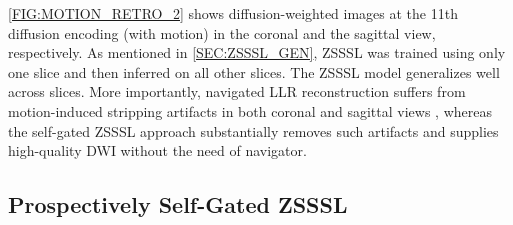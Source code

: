 \documentclass[journal,twoside,web]{ieeecolor}
\begin{document}
	\cref{FIG:MOTION_RETRO_2} shows diffusion-weighted images
	at the 11th diffusion encoding (with motion)
	in the coronal and the sagittal view, respectively.
	As mentioned in \cref{SEC:ZSSSL_GEN}, ZSSSL was trained using only one slice
	and then inferred on all other slices.
	The ZSSSL model generalizes well across slices.
	More importantly, navigated LLR reconstruction suffers from motion-induced
	stripping artifacts in both coronal and sagittal views \cite{chang_2021_musium},
	whereas the self-gated ZSSSL approach substantially removes such artifacts
	and supplies high-quality DWI without the need of navigator.


	\subsection{Prospectively Self-Gated ZSSSL}
\end{document}
